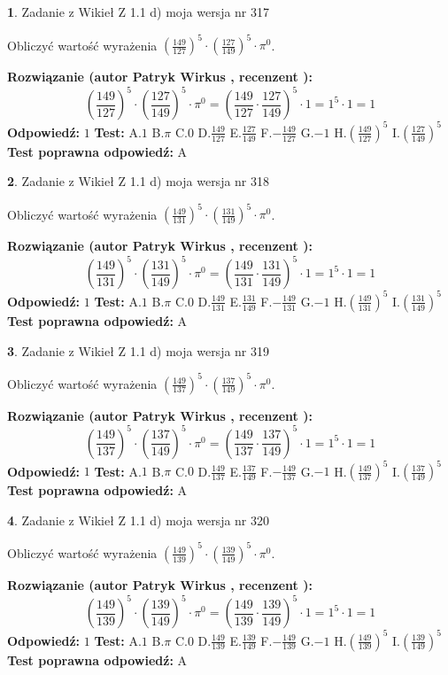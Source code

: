 \documentclass[12pt, a4paper]{article}
\theoremstyle{definition} %
\newtheorem{zad}{}
\newcommand{\zadStart}[1]{\begin{zad}#1\newline}
\newcommand{\zadStop}{\end{zad}}
\newcommand{\rozwStart}[2]{\noindent \textbf{Rozwiązanie (autor #1 , recenzent #2): }\newline}
\newcommand{\rozwStop}{\newline}
\newcommand{\odpStart}{\noindent \textbf{Odpowiedź:}\newline}
\newcommand{\odpStop}{\newline}
\newcommand{\testStart}{\noindent \textbf{Test:}\newline}
\newcommand{\testStop}{\newline}
\newcommand{\kluczStart}{\noindent \textbf{Test poprawna odpowiedź:}\newline}
\newcommand{\kluczStop}{\newline}
\begin{document}
\zadStart{Zadanie z Wikieł Z 1.1 d) moja wersja nr 317}

Obliczyć wartość wyrażenia $(\frac{149}{127})^{5} \cdot (\frac{127}{149})^{5} \cdot \pi^{0}$.
\zadStop
\rozwStart{Patryk Wirkus}{}
$$(\frac{149}{127})^{5} \cdot (\frac{127}{149})^{5} \cdot \pi^{0} = (\frac{149}{127} \cdot \frac{127}{149})^{5} \cdot 1 = 1^{5} \cdot 1 = 1$$
\rozwStop
\odpStart
$1$
\odpStop
\testStart
A.$1$ B.$\pi$ C.$0$ D.$\frac{149}{127}$ E.$\frac{127}{149}$
F.$-\frac{149}{127}$ G.$-1$
H.$(\frac{149}{127})^{5}$
I.$(\frac{127}{149})^{5}$
\testStop
\kluczStart
A
\kluczStop



\zadStart{Zadanie z Wikieł Z 1.1 d) moja wersja nr 318}

Obliczyć wartość wyrażenia $(\frac{149}{131})^{5} \cdot (\frac{131}{149})^{5} \cdot \pi^{0}$.
\zadStop
\rozwStart{Patryk Wirkus}{}
$$(\frac{149}{131})^{5} \cdot (\frac{131}{149})^{5} \cdot \pi^{0} = (\frac{149}{131} \cdot \frac{131}{149})^{5} \cdot 1 = 1^{5} \cdot 1 = 1$$
\rozwStop
\odpStart
$1$
\odpStop
\testStart
A.$1$ B.$\pi$ C.$0$ D.$\frac{149}{131}$ E.$\frac{131}{149}$
F.$-\frac{149}{131}$ G.$-1$
H.$(\frac{149}{131})^{5}$
I.$(\frac{131}{149})^{5}$
\testStop
\kluczStart
A
\kluczStop



\zadStart{Zadanie z Wikieł Z 1.1 d) moja wersja nr 319}

Obliczyć wartość wyrażenia $(\frac{149}{137})^{5} \cdot (\frac{137}{149})^{5} \cdot \pi^{0}$.
\zadStop
\rozwStart{Patryk Wirkus}{}
$$(\frac{149}{137})^{5} \cdot (\frac{137}{149})^{5} \cdot \pi^{0} = (\frac{149}{137} \cdot \frac{137}{149})^{5} \cdot 1 = 1^{5} \cdot 1 = 1$$
\rozwStop
\odpStart
$1$
\odpStop
\testStart
A.$1$ B.$\pi$ C.$0$ D.$\frac{149}{137}$ E.$\frac{137}{149}$
F.$-\frac{149}{137}$ G.$-1$
H.$(\frac{149}{137})^{5}$
I.$(\frac{137}{149})^{5}$
\testStop
\kluczStart
A
\kluczStop



\zadStart{Zadanie z Wikieł Z 1.1 d) moja wersja nr 320}

Obliczyć wartość wyrażenia $(\frac{149}{139})^{5} \cdot (\frac{139}{149})^{5} \cdot \pi^{0}$.
\zadStop
\rozwStart{Patryk Wirkus}{}
$$(\frac{149}{139})^{5} \cdot (\frac{139}{149})^{5} \cdot \pi^{0} = (\frac{149}{139} \cdot \frac{139}{149})^{5} \cdot 1 = 1^{5} \cdot 1 = 1$$
\rozwStop
\odpStart
$1$
\odpStop
\testStart
A.$1$ B.$\pi$ C.$0$ D.$\frac{149}{139}$ E.$\frac{139}{149}$
F.$-\frac{149}{139}$ G.$-1$
H.$(\frac{149}{139})^{5}$
I.$(\frac{139}{149})^{5}$
\testStop
\kluczStart
A
\kluczStop
\end{document}
